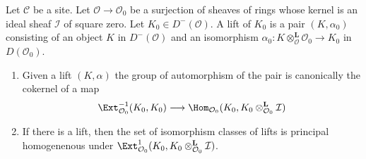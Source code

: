 \begin{lemma}
\label{lemma-first-order-defos-complex}
Let $\mathcal{C}$ be a site. Let $\mathcal{O} \to \mathcal{O}_0$
be a surjection of sheaves of rings whose kernel is an ideal sheaf
$\mathcal{I}$ of square zero. Let $K_0 \in D^-(\mathcal{O})$.
A lift of $K_0$ is a pair $(K, \alpha_0)$ consisting of an object
$K$ in $D^-(\mathcal{O})$ and an isomorphism
$\alpha_0 : K \otimes_\mathcal{O}^\mathbf{L} \mathcal{O}_0 \to K_0$
in $D(\mathcal{O}_0)$.
\begin{enumerate}
\item Given a lift $(K, \alpha)$ the group of automorphism of the pair
is canonically the cokernel of a map
$$
\Ext^{-1}_{\mathcal{O}_0}(K_0, K_0)
\longrightarrow
\Hom_{\mathcal{O}_0}(K_0, K_0 \otimes_{\mathcal{O}_0}^\mathbf{L} \mathcal{I})
$$
\item If there is a lift, then the set of isomorphism classes of lifts
is principal homogenenous under
$\Ext^1_{\mathcal{O}_0}(K_0,
K_0 \otimes_{\mathcal{O}_0}^\mathbf{L} \mathcal{I})$.
\end{enumerate}
\end{lemma}

